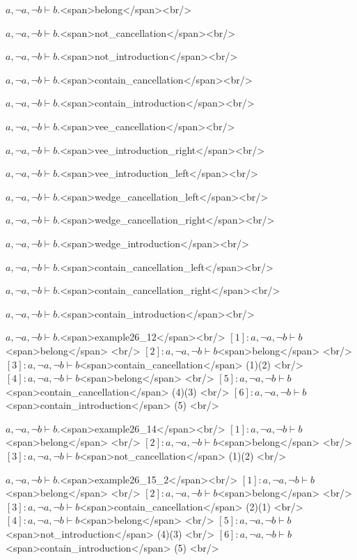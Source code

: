  \( a, \neg a, \neg b \vdash b .\)<span>belong</span><br/>

 \( a, \neg a, \neg b \vdash b .\)<span>not_cancellation</span><br/>

 \( a, \neg a, \neg b \vdash b .\)<span>not_introduction</span><br/>

 \( a, \neg a, \neg b \vdash b .\)<span>contain_cancellation</span><br/>

 \( a, \neg a, \neg b \vdash b .\)<span>contain_introduction</span><br/>

 \( a, \neg a, \neg b \vdash b .\)<span>vee_cancellation</span><br/>

 \( a, \neg a, \neg b \vdash b .\)<span>vee_introduction_right</span><br/>

 \( a, \neg a, \neg b \vdash b .\)<span>vee_introduction_left</span><br/>

 \( a, \neg a, \neg b \vdash b .\)<span>wedge_cancellation_left</span><br/>

 \( a, \neg a, \neg b \vdash b .\)<span>wedge_cancellation_right</span><br/>

 \( a, \neg a, \neg b \vdash b .\)<span>wedge_introduction</span><br/>

 \( a, \neg a, \neg b \vdash b .\)<span>contain_cancellation_left</span><br/>

 \( a, \neg a, \neg b \vdash b .\)<span>contain_cancellation_right</span><br/>

 \( a, \neg a, \neg b \vdash b .\)<span>contain_introduction</span><br/>

 \( a, \neg a, \neg b \vdash b .\)<span>example26_12</span><br/>
\([1]: a, \neg a, \neg b \vdash b  \)<span>belong</span>
  <br/>
\([2]: a, \neg a, \neg b \vdash b  \)<span>belong</span>
  <br/>
\([3]: a, \neg a, \neg b \vdash b  \)<span>contain_cancellation</span>
 (1)(2) <br/>
\([4]: a, \neg a, \neg b \vdash b  \)<span>belong</span>
  <br/>
\([5]: a, \neg a, \neg b \vdash b  \)<span>contain_cancellation</span>
 (4)(3) <br/>
\([6]: a, \neg a, \neg b \vdash b  \)<span>contain_introduction</span>
 (5) <br/>

 \( a, \neg a, \neg b \vdash b .\)<span>example26_14</span><br/>
\([1]: a, \neg a, \neg b \vdash b  \)<span>belong</span>
  <br/>
\([2]: a, \neg a, \neg b \vdash b  \)<span>belong</span>
  <br/>
\([3]: a, \neg a, \neg b \vdash b  \)<span>not_cancellation</span>
 (1)(2) <br/>

 \( a, \neg a, \neg b \vdash b .\)<span>example26_15_2</span><br/>
\([1]: a, \neg a, \neg b \vdash b  \)<span>belong</span>
  <br/>
\([2]: a, \neg a, \neg b \vdash b  \)<span>belong</span>
  <br/>
\([3]: a, \neg a, \neg b \vdash b  \)<span>contain_cancellation</span>
 (2)(1) <br/>
\([4]: a, \neg a, \neg b \vdash b  \)<span>belong</span>
  <br/>
\([5]: a, \neg a, \neg b \vdash b  \)<span>not_introduction</span>
 (4)(3) <br/>
\([6]: a, \neg a, \neg b \vdash b  \)<span>contain_introduction</span>
 (5) <br/>

